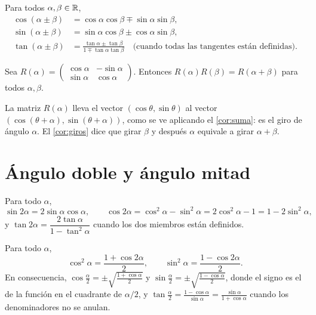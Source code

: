\begin{corolario}\label{cor:suma}
Para todos $\alpha,\beta\in\mathbb{R}$,
\begin{align*}
\cos(\alpha\pm\beta)&=\cos\alpha\cos\beta\mp\sin\alpha\sin\beta,\\
\sin(\alpha\pm\beta)&=\sin\alpha\cos\beta\pm\cos\alpha\sin\beta,\\
\tan(\alpha\pm\beta)&=\frac{\tan\alpha\pm\tan\beta}{1\mp\tan\alpha\tan\beta}\quad\text{(cuando todas las tangentes están definidas).}
\end{align*}
\end{corolario}

\addtocounter{definicion}{1}%

\begin{corolario}\label{cor:giros}
Sea $R(\alpha)=\begin{pmatrix}\cos\alpha&-\sin\alpha\\ \sin\alpha&\cos\alpha\end{pmatrix}$. Entonces $R(\alpha)R(\beta)=R(\alpha+\beta)$ para todos $\alpha,\beta$.
\end{corolario}

La matriz $R(\alpha)$ lleva el vector $(\cos\theta,\sin\theta)$ al vector $(\cos(\theta+\alpha),\sin(\theta+\alpha))$, como se ve aplicando el \cref{cor:suma}: es el giro de ángulo $\alpha$. El \cref{cor:giros} dice que girar $\beta$ y después $\alpha$ equivale a girar $\alpha+\beta$.

\section{Ángulo doble y ángulo mitad}

\begin{proposicion}\label{prop:doble}
Para todo $\alpha$,
\[
\sin 2\alpha=2\sin\alpha\cos\alpha,\qquad \cos 2\alpha=\cos^{2}\alpha-\sin^{2}\alpha=2\cos^{2}\alpha-1=1-2\sin^{2}\alpha,
\]
y $\tan 2\alpha=\dfrac{2\tan\alpha}{1-\tan^{2}\alpha}$ cuando los dos miembros están definidos.
\end{proposicion}

\begin{corolario}\label{cor:mitad}
Para todo $\alpha$,
\[
\cos^{2}\alpha=\frac{1+\cos 2\alpha}{2},\qquad \sin^{2}\alpha=\frac{1-\cos 2\alpha}{2}.
\]
En consecuencia, $\cos\frac{\alpha}{2}=\pm\sqrt{\frac{1+\cos\alpha}{2}}$ y $\sin\frac{\alpha}{2}=\pm\sqrt{\frac{1-\cos\alpha}{2}}$, donde el signo es el de la función en el cuadrante de $\alpha/2$, y $\tan\frac{\alpha}{2}=\frac{1-\cos\alpha}{\sin\alpha}=\frac{\sin\alpha}{1+\cos\alpha}$ cuando los denominadores no se anulan.
\end{corolario}


